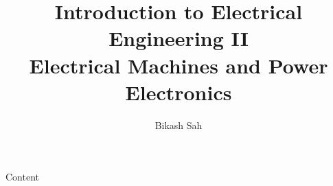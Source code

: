 \documentclass{../course_template/lectureClass}
\begin{document}

\title[Introduction to Electrical Engineering II]{Introduction to Electrical Engineering II \\ Electrical Machines and Power Electronics}
\author{Bikash Sah}
\date{}
\begin{frame}[plain]
    \titlepage
\end{frame}

\begin{frame}{Content}
    \tableofcontents
\end{frame}


%


\end{document}

